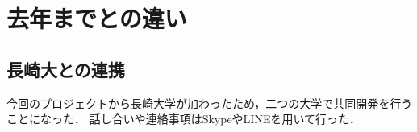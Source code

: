\section{去年までとの違い}
\subsection{長崎大との連携}
 今回のプロジェクトから長崎大学が加わったため，二つの大学で共同開発を行うことになった．
 話し合いや連絡事項はSkypeやLINEを用いて行った．
